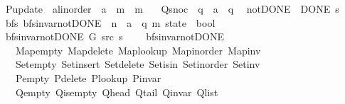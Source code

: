 \begin{isabellebody}
\ \ P{\isacharunderscore}{\kern0pt}update\ {\isacharcolon}{\kern0pt}{\isacharcolon}{\kern0pt}\ {\isachardoublequoteopen}{\isacharprime}{\kern0pt}a{\isacharcolon}{\kern0pt}{\isacharcolon}{\kern0pt}linorder\ {\isasymRightarrow}\ {\isacharprime}{\kern0pt}a\ {\isasymRightarrow}\ {\isacharprime}{\kern0pt}m\ {\isasymRightarrow}\ {\isacharprime}{\kern0pt}m{\isachardoublequoteclose}\ \isanewline
\ \ Q{\isacharunderscore}{\kern0pt}snoc\ {\isacharcolon}{\kern0pt}{\isacharcolon}{\kern0pt}\ {\isachardoublequoteopen}{\isacharprime}{\kern0pt}q\ {\isasymRightarrow}\ {\isacharprime}{\kern0pt}a\ {\isasymRightarrow}\ {\isacharprime}{\kern0pt}q{\isachardoublequoteclose}\ {\isacharplus}{\kern0pt}\isanewline
{}\ not{\isacharunderscore}{\kern0pt}DONE{\isacharcolon}{\kern0pt}\ {\isachardoublequoteopen}{\isasymnot}\ DONE\ s{\isachardoublequoteclose}\isanewline
\isanewline
{}\isamarkupfalse%
\ {\isacharparenleft}{\kern0pt}\ bfs{\isacharparenright}{\kern0pt}\ bfs{\isacharunderscore}{\kern0pt}invar{\isacharunderscore}{\kern0pt}not{\isacharunderscore}{\kern0pt}DONE{\isacharprime}{\kern0pt}\ {\isacharcolon}{\kern0pt}{\isacharcolon}{\kern0pt}\ {\isachardoublequoteopen}{\isacharprime}{\kern0pt}n\ {\isasymRightarrow}\ {\isacharprime}{\kern0pt}a\ {\isasymRightarrow}\ {\isacharparenleft}{\kern0pt}{\isacharprime}{\kern0pt}q{\isacharcomma}{\kern0pt}\ {\isacharprime}{\kern0pt}m{\isacharparenright}{\kern0pt}\ state\ {\isasymRightarrow}\ bool{\isachardoublequoteclose}\ \isanewline
\ \ {\isachardoublequoteopen}bfs{\isacharunderscore}{\kern0pt}invar{\isacharunderscore}{\kern0pt}not{\isacharunderscore}{\kern0pt}DONE{\isacharprime}{\kern0pt}\ G\ src\ s\ {\isasymequiv}\isanewline
\ \ \ bfs{\isacharunderscore}{\kern0pt}invar{\isacharunderscore}{\kern0pt}not{\isacharunderscore}{\kern0pt}DONE\isanewline
\ \ \ \ Map{\isacharunderscore}{\kern0pt}empty\ Map{\isacharunderscore}{\kern0pt}delete\ Map{\isacharunderscore}{\kern0pt}lookup\ Map{\isacharunderscore}{\kern0pt}inorder\ Map{\isacharunderscore}{\kern0pt}inv\isanewline
\ \ \ \ Set{\isacharunderscore}{\kern0pt}empty\ Set{\isacharunderscore}{\kern0pt}insert\ Set{\isacharunderscore}{\kern0pt}delete\ Set{\isacharunderscore}{\kern0pt}isin\ Set{\isacharunderscore}{\kern0pt}inorder\ Set{\isacharunderscore}{\kern0pt}inv\isanewline
\ \ \ \ P{\isacharunderscore}{\kern0pt}empty\ P{\isacharunderscore}{\kern0pt}delete\ P{\isacharunderscore}{\kern0pt}lookup\ P{\isacharunderscore}{\kern0pt}invar\isanewline
\ \ \ \ Q{\isacharunderscore}{\kern0pt}empty\ Q{\isacharunderscore}{\kern0pt}is{\isacharunderscore}{\kern0pt}empty\ Q{\isacharunderscore}{\kern0pt}head\ Q{\isacharunderscore}{\kern0pt}tail\ Q{\isacharunderscore}{\kern0pt}invar\ Q{\isacharunderscore}{\kern0pt}list\isanewline

\end{isabellebody}
